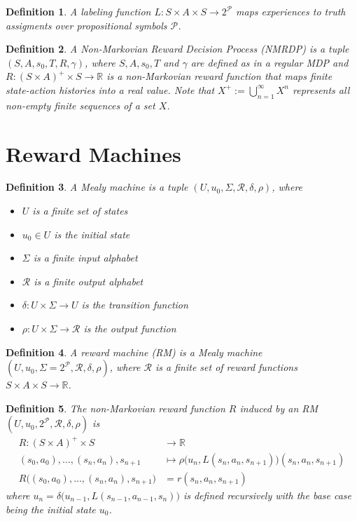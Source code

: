 \documentclass[12pt, a4paper]{article}
\theoremstyle{plain}
\newtheorem*{definition}{Definition}
\begin{document}
\begin{definition}
	A \emph{labeling function} $L : S \times A \times S \to 2^{\mathcal{P}}$ maps experiences to truth assigments over propositional symbols $\mathcal{P}$.
\end{definition}

\begin{definition}
	A \emph{Non-Markovian Reward Decision Process (NMRDP)} is a tuple $(S, A, s_0, T, R, \gamma)$, where $S, A, s_0, T$ and $\gamma$ are defined as in a regular MDP and $R : (S \times A)^+ \times S \to \mathbb{R}$ is a non-Markovian reward function that maps finite state-action histories into a real value. Note that $X^+ := \bigcup_{n=1}^{\infty} X^n$ represents all non-empty finite sequences of a set $X$.
\end{definition}

\section*{Reward Machines}

\begin{definition}
	A \emph{Mealy machine} is a tuple $(U, u_0, \Sigma, \mathcal{R}, \delta, \rho)$, where
	\begin{itemize}
		\item $U$ is a finite set of states
		\item $u_0 \in U$ is the initial state
		\item $\Sigma$ is a finite input alphabet
		\item $\mathcal{R}$ is a finite output alphabet
		\item $\delta : U \times \Sigma \to U$ is the transition function
		\item $\rho : U \times \Sigma \to \mathcal{R}$ is the output function
	\end{itemize}
\end{definition}

\begin{definition}
	A \emph{reward machine (RM)} is a Mealy machine $(U, u_0, \Sigma = 2^\mathcal{P}, \mathcal{R}, \delta, \rho)$, where $\mathcal{R}$ is a finite set of reward functions $S \times A \times S \to \mathbb{R}$.
\end{definition}

\begin{definition}
	The non-Markovian reward function $R$ \emph{induced by an RM} $(U, u_0, 2^\mathcal{P}, \mathcal{R}, \delta, \rho)$ is
	\begin{align*}
		R : (S \times A)^+ \times S                       & \to \mathbb{R}                                                     \\
		(s_0, a_0), \dots, (s_n, a_n), s_{n+1}            & \mapsto \rho\big(u_n, L(s_n, a_n, s_{n+1})\big)(s_n, a_n, s_{n+1}) \\
		R\big((s_0, a_0), \dots, (s_n, a_n), s_{n+1}\big) & = r(s_n, a_n, s_{n+1})
	\end{align*}
	where $u_n = \delta\big(u_{n-1}, L(s_{n-1}, a_{n-1}, s_n)\big)$ is defined recursively with the base case being the initial state $u_0$.
\end{definition}
\end{document}

